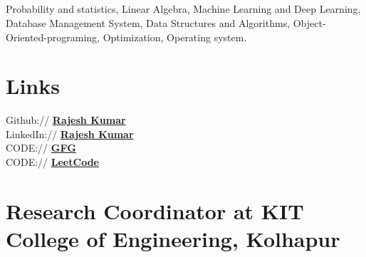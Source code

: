 \documentclass[]{deedy-resume-reversed}
\begin{document}
\begin{minipage}[t]{0.33\textwidth}
\subsection{}
Probability and statistics, Linear Algebra, Machine Learning and Deep Learning, Database Management System, Data Structures and Algorithms, Object-Oriented-programing, Optimization, Operating system.
\sectionsep


\section{Links}
Github:// \href{https://github.com/rajesh0305/}{\bf Rajesh Kumar} \\
LinkedIn://  \href{https://www.linkedin.com/in/rajesh-kumar-564b8a188/}{\bf Rajesh Kumar}\\
CODE:// \href{https://www.geeksforgeeks.org/user/rajeshrajput/}{\bf GFG}\\
CODE:// \href{https://leetcode.com/u/datafunda/}{\bf LeetCode}
\sectionsep

\end{minipage}

\newpage
\pagestyle{fancy}
\fancyhf{}
\renewcommand{\headrulewidth}{0pt}
\cfoot{\thepage}


\section{Research Coordinator at KIT College of Engineering, Kolhapur}

\end{document}
